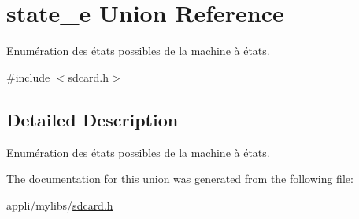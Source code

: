 \hypertarget{unionstate__e}{}\section{state\+\_\+e Union Reference}
\label{unionstate__e}


Enumération des états possibles de la machine à états.  




{\ttfamily \#include $<$sdcard.\+h$>$}



\subsection{Detailed Description}
Enumération des états possibles de la machine à états. 

The documentation for this union was generated from the following file\+:\begin{DoxyCompactItemize}
\item 
appli/mylibs/\hyperlink{sdcard_8h}{sdcard.\+h}\end{DoxyCompactItemize}
